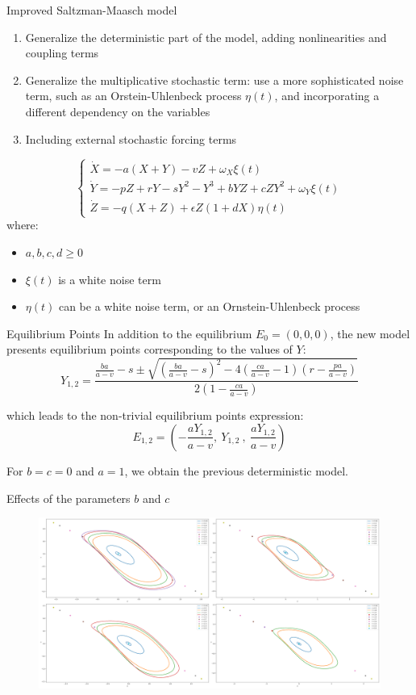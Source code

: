 \documentclass[10pt]{beamer}
\begin{document}
\begin{frame}{Improved Saltzman-Maasch model}
	\begin{enumerate}
		\item Generalize the deterministic part of the model, adding nonlinearities 
		and coupling terms
		\item Generalize the multiplicative stochastic term: use a more sophisticated 
		noise term, such as an Orstein-Uhlenbeck process $\eta(t)$, and incorporating a 
		different dependency on the variables
		\item Including external stochastic forcing terms
	\end{enumerate}
	\[
		\begin{cases}
			\dot{X} = -a(X+Y) -vZ + \omega_X \xi(t) \\ 
			\dot{Y} = -pZ + rY -sY^2 -Y^3 +bYZ +cZY^2 + \omega_Y \xi(t)\\
			\dot{Z} = -q(X+Z) + \epsilon Z (1 + dX) \eta(t)
		\end{cases}
	\]
	where:
	\begin{itemize}
		\item $a, b, c, d \geq 0$
		\item $\xi(t)$ is a white noise term
		\item $\eta(t)$ can be a white noise term, or an Ornstein-Uhlenbeck process
	\end{itemize}
\end{frame}

\begin{frame}{Equilibrium Points}
	In addition to the equilibrium $E_0=(0,0,0)$, the new model presents equilibrium points corresponding to the values of $Y$:
	\[
	Y_{1, 2} = \frac{\frac{ba}{a-v}-s \pm \sqrt{\left(\frac{ba}{a-v}-s\right)^2-4\left(\frac{ca}{a-v}-1\right)\left(r-\frac{pa}{a-v}\right)}} {2\left(1-\frac{ca}{a-v}\right)}
	\]
	
	which leads to the non-trivial equilibrium points expression:
	\[
	E_{1,2} = \left(-\frac{aY_{1,2}}{a-v}, \ Y_{1,2} \ , \ \frac{aY_{1,2}}{a-v}\right)
	\]

	For $b=c=0$ and $a=1$, we obtain the previous deterministic model.
\end{frame}

\begin{frame}{Effects of the parameters $b$ and $c$}
	\begin{figure}
		\includegraphics[width=\textwidth, height=\textheight,keepaspectratio]{figures_2/adv-attractors-b-c-2.png}
	\end{figure}
\end{frame}
\end{document}
